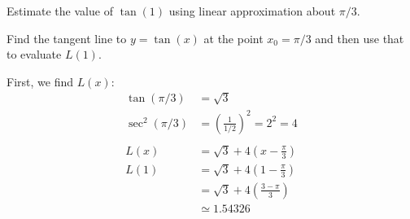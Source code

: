 \documentclass{ximera}
\author{Emma Smith Zbarsky}
\begin{document}
\begin{exercise}

Estimate the value of $\tan(1)$ using linear approximation about
$\pi/3$.


\begin{hint}
Find the tangent line to $y=\tan(x)$ at the point $x_0=\pi/3$ and then
use that to evaluate $L(1)$.
\end{hint}


\begin{hint}
First, we find $L(x)$: \begin{align*}
\tan(\pi/3) &= \sqrt{3} \\
\sec^2(\pi/3) &= \left(\frac{1}{1/2}\right)^2 = 2^2 = 4\\
&\\
L(x) &= \sqrt{3}+4\left(x-\frac{\pi}{3}\right) \\
L(1) &= \sqrt{3}+4\left(1-\frac{\pi}{3}\right) \\
&= \sqrt{3}+4\left(\frac{3-\pi}{3}\right) \\
&\simeq 1.54326
\end{align*}
\end{hint}


\begin{multipleChoice}
\end{multipleChoice}

\end{exercise}
\end{document}
